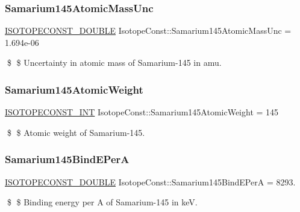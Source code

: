 \subsubsection{\texorpdfstring{Samarium145\+Atomic\+Mass\+Unc}{Samarium145AtomicMassUnc}}
{\footnotesize\ttfamily \mbox{\hyperlink{group___isotope_const-_macros_ga8f45a7272ce02c0b4c65c44636ed719a}{I\+S\+O\+T\+O\+P\+E\+C\+O\+N\+S\+T\+\_\+\+D\+O\+U\+B\+LE}} Isotope\+Const\+::\+Samarium145\+Atomic\+Mass\+Unc = 1.\+694e-\/06}

\$ \$ Uncertainty in atomic mass of Samarium-\/145 in amu. \mbox{\label{group___isotope_const-_samarium-_sm145_ga1a430476f1e8e52a4878b48fd610f991}} 
\subsubsection{\texorpdfstring{Samarium145\+Atomic\+Weight}{Samarium145AtomicWeight}}
{\footnotesize\ttfamily \mbox{\hyperlink{group___isotope_const-_macros_ga5f18360b3e99483a35c32d789e62621c}{I\+S\+O\+T\+O\+P\+E\+C\+O\+N\+S\+T\+\_\+\+I\+NT}} Isotope\+Const\+::\+Samarium145\+Atomic\+Weight = 145}

\$ \$ Atomic weight of Samarium-\/145. \mbox{\label{group___isotope_const-_samarium-_sm145_gada5bfb27a2d079d696a3547bbb071032}} 
\subsubsection{\texorpdfstring{Samarium145\+Bind\+E\+PerA}{Samarium145BindEPerA}}
{\footnotesize\ttfamily \mbox{\hyperlink{group___isotope_const-_macros_ga8f45a7272ce02c0b4c65c44636ed719a}{I\+S\+O\+T\+O\+P\+E\+C\+O\+N\+S\+T\+\_\+\+D\+O\+U\+B\+LE}} Isotope\+Const\+::\+Samarium145\+Bind\+E\+PerA = 8293.}

\$ \$ Binding energy per A of Samarium-\/145 in keV. \mbox{\label{group___isotope_const-_samarium-_sm145_ga509e5a6d8c40615de4c7ec249bd11332}} 
